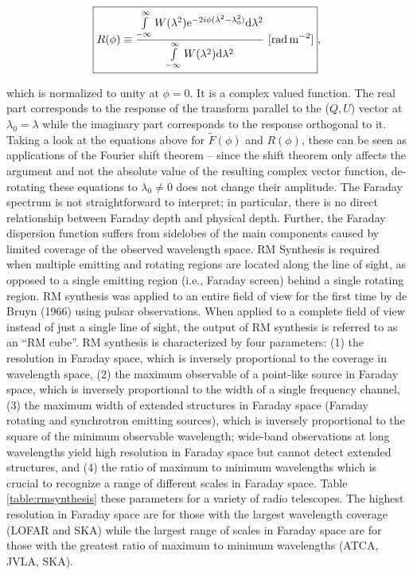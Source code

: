 \documentclass[a4paper,11pt]{article}
\begin{document}
\begin{align*}
    \boxed{R(\phi) \equiv \dfrac{\int\limits_{-\infty}^\infty W(\lambda^2)\mathrm{e}^{-2i\phi(\lambda^2-\lambda_0^2)}\mathrm{d}\lambda^2}{\int\limits_{-\infty}^\infty W(\lambda^2)\mathrm{d}\lambda^2} ~ [{\rm rad\,m^{-2}}]},
\end{align*}

{\noindent}which is normalized to unity at $\phi=0$. It is a complex valued function. The real part corresponds to the response of the transform parallel to the ($Q,U$) vector at $\lambda_0=\lambda$ while the imaginary part corresponds to the response orthogonal to it. Taking a look at the equations above for $\tilde{F}(\phi)$ and $R(\phi)$, these can be seen as applications of the Fourier shift theorem -- since the shift theorem only affects the argument and not the absolute value of the resulting complex vector function, de-rotating these equations to $\lambda_0\neq0$ does not change their amplitude. The Faraday spectrum is not straightforward to interpret; in particular, there is no direct relationship between Faraday depth and physical depth. Further, the Faraday dispersion function suffers from sidelobes of the main components caused by limited coverage of the observed wavelength space. RM Synthesis is required when multiple emitting and rotating regions are located along the line of sight, as opposed to a single emitting region (i.e., Faraday screen) behind a single rotating region. RM synthesis was applied to an entire field of view for the first time by de Bruyn (1966) using pulsar observations. When applied to a complete field of view instead of just a single line of sight, the output of RM synthesis is referred to as an ``RM cube''. RM synthesis is characterized by four parameters: (1) the resolution in Faraday space, which is inversely proportional to the coverage in wavelength space, (2) the maximum observable of a point-like source in Faraday space, which is inversely proportional to the width of a single frequency channel, (3) the maximum width of extended structures in Faraday space (Faraday rotating and synchrotron emitting sources), which is inversely proportional to the square of the minimum observable wavelength; wide-band observations at long wavelengths yield high resolution in Faraday space but cannot detect extended structures, and (4) the ratio of maximum to minimum wavelengths which is crucial to recognize a range of different scales in Faraday space. Table \ref{table:rmsynthesis} these parameters for a variety of radio telescopes. The highest resolution in Faraday space are for those with the largest wavelength coverage (LOFAR and SKA) while the largest range of scales in Faraday space are for those with the greatest ratio of maximum to minimum wavelengths (ATCA, JVLA, SKA).
\end{document}

